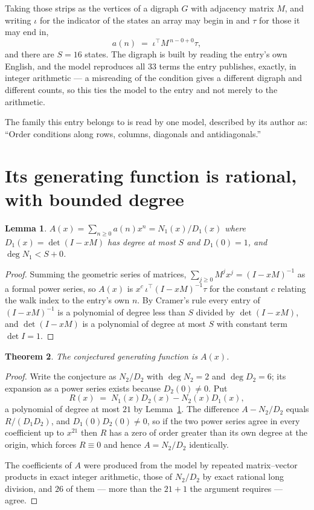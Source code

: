 \documentclass[11pt,a4paper]{article}
\theoremstyle{plain}
\newtheorem{theorem}{Theorem}
\newtheorem{lemma}[theorem]{Lemma}
\theoremstyle{definition}
\begin{document}
Taking those strips as the vertices of a digraph $G$ with adjacency matrix $M$, and writing
$\iota$ for the indicator of the states an array may begin in and $\tau$ for those it may end
in,
\[
a(n)\;=\;\iota^{\!\top}M^{\,n-0+0}\tau ,
\]
and there are $S=16$ states. The digraph is built by reading the entry's own English, and the
model reproduces all $33$ terms the entry publishes, exactly, in integer arithmetic --- a
misreading of the condition gives a different digraph and different counts, so this ties the
model to the entry and not merely to the arithmetic.

The family this entry belongs to is read by one model, described by its author as: ``Order conditions along rows, columns, diagonals and antidiagonals.''


\section{Its generating function is rational, with bounded degree}

\begin{lemma}\label{lem:rat}
$A(x)=\sum_{n\ge0}a(n)x^n=N_1(x)/D_1(x)$ where $D_1(x)=\det(I-xM)$ has degree at most
$S$ and $D_1(0)=1$, and $\deg N_1<S+0$.
\end{lemma}

\begin{proof}
Summing the geometric series of matrices, $\sum_{j\ge0}M^jx^j=(I-xM)^{-1}$ as a formal
power series, so $A(x)$ is $x^{c}\,\iota^{\!\top}(I-xM)^{-1}\tau$ for the constant $c$
relating the walk index to the entry's own $n$. By Cramer's rule every entry of
$(I-xM)^{-1}$ is a polynomial of degree less than $S$ divided by $\det(I-xM)$, and
$\det(I-xM)$ is a polynomial of degree at most $S$ with constant term $\det I=1$.
\end{proof}

\begin{theorem}
The conjectured generating function is $A(x)$.
\end{theorem}

\begin{proof}
Write the conjecture as $N_2/D_2$ with $\deg N_2=2$ and $\deg D_2=6$; its expansion as a
power series exists because $D_2(0)\neq0$. Put
\[
R(x)\;=\;N_1(x)D_2(x)-N_2(x)D_1(x),
\]
a polynomial of degree at most $21$ by Lemma~\ref{lem:rat}. The difference
$A-N_2/D_2$ equals $R/(D_1D_2)$, and $D_1(0)D_2(0)\neq0$, so if the two power series agree in
every coefficient up to $x^{21}$ then $R$ has a zero of order greater than its own
degree at the origin, which forces $R\equiv0$ and hence $A=N_2/D_2$ identically.

The coefficients of $A$ were produced from the model by repeated matrix--vector products in
exact integer arithmetic, those of $N_2/D_2$ by exact rational long division, and $26$
of them --- more than the $21+1$ the argument requires --- agree.
\end{proof}
\end{document}

